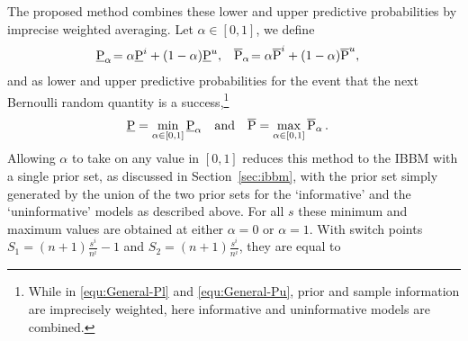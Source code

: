 The proposed method combines these
lower and upper predictive probabilities by imprecise weighted averaging.
Let $\alpha \in [0,1]$, we define%
\begin{align} \label{alpha-lowupp}
\underline{\operatorname{P}}_{\alpha}\! &= \alpha \underline{\operatorname{P}}^i + (1-\alpha) \underline{\operatorname{P}}^u, &
\overline{\operatorname{P}}_{\alpha}\! &= \alpha \overline{\operatorname{P}}^i + (1-\alpha) \overline{\operatorname{P}}^u,
\end{align}
and as lower and upper predictive probabilities for the event that
the next Bernoulli random quantity is a success,\footnote{%
While in \eqref{equ:General-Pl} and \eqref{equ:General-Pu}, prior
and sample information are imprecisely weighted, here informative
and uninformative models are combined.}%
%
\begin{align*}
\Pl &= \min_{\alpha \in [0,1]} \Pl_{\alpha} & \text{and}& & %
\Pu &= \max_{\alpha \in [0,1]} \Pu_{\alpha} \,.             %
\end{align*}
Allowing $\alpha$ to take on any value in $[0,1]$ reduces
this method to the IBBM %
with a single prior set, as discussed in Section~\ref{sec:ibbm}, with the prior
set simply generated by the union of the two prior sets for the
`informative' and the `uninformative' models as described above.
For all $s$ these minimum and maximum values
are obtained at either $\alpha=0$
or $\alpha=1$. With switch points $S_1=(n+1)\frac{s^i}{n^i}-1$ and
$S_2=(n+1)\frac{s^i}{n^i}$, they are equal to%
